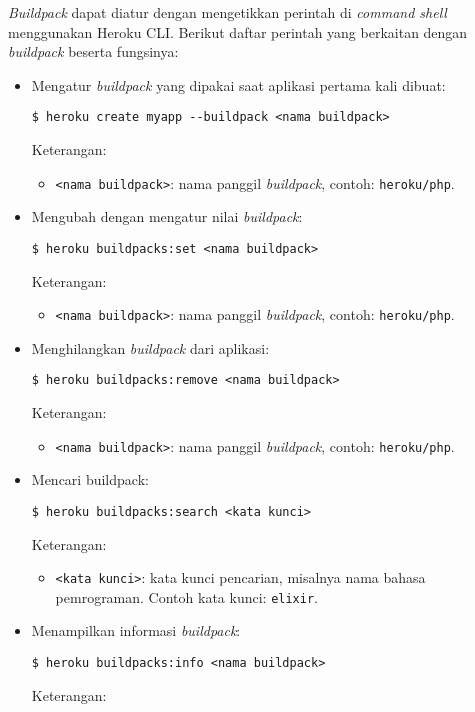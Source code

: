 \textit{Buildpack} dapat diatur dengan mengetikkan perintah di \textit{command shell} menggunakan Heroku CLI. Berikut daftar perintah yang berkaitan dengan \textit{buildpack} beserta fungsinya:
\begin{itemize}
\item Mengatur \textit{buildpack} yang dipakai saat aplikasi pertama kali dibuat:
\begin{lstlisting}
$ heroku create myapp --buildpack <nama buildpack>
\end{lstlisting}
Keterangan:
\begin{itemize}
\item \texttt{<nama buildpack>}: nama panggil \textit{buildpack}, contoh: \texttt{heroku/php}.
\end{itemize}
\item Mengubah dengan mengatur nilai \textit{buildpack}:
\begin{lstlisting}
$ heroku buildpacks:set <nama buildpack>
\end{lstlisting}
Keterangan:
\begin{itemize}
\item \texttt{<nama buildpack>}: nama panggil \textit{buildpack}, contoh: \texttt{heroku/php}.
\end{itemize}
\item Menghilangkan \textit{buildpack} dari aplikasi:
\begin{lstlisting}
$ heroku buildpacks:remove <nama buildpack>
\end{lstlisting}
Keterangan:
\begin{itemize}
\item \texttt{<nama buildpack>}: nama panggil \textit{buildpack}, contoh: \texttt{heroku/php}.
\end{itemize}
\item Mencari buildpack:
\begin{lstlisting}
$ heroku buildpacks:search <kata kunci>
\end{lstlisting}
Keterangan:
\begin{itemize}
\item \texttt{<kata kunci>}: kata kunci pencarian, misalnya nama bahasa pemrograman. Contoh kata kunci: \texttt{elixir}.
\end{itemize}
\item Menampilkan informasi \textit{buildpack}:
\begin{lstlisting}
$ heroku buildpacks:info <nama buildpack>	
\end{lstlisting}
Keterangan:
\begin{itemize}

\end{itemize}
\end{itemize}
